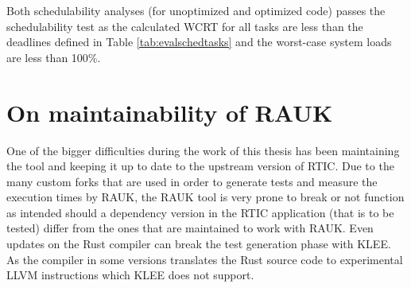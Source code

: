 Both schedulability analyses (for unoptimized and optimized code) passes the
schedulability test as the calculated WCRT for all tasks are less than
the deadlines defined in Table \ref{tab:evalschedtasks} and the worst-case
system loads are less than 100\%.

\section{On maintainability of RAUK}
One of the bigger difficulties during the work of this thesis has been
maintaining the tool and keeping it up to date to the upstream version of RTIC.
Due to the many custom forks that are used in order to generate tests and
measure the execution times by RAUK, the RAUK tool is very prone to break or
not function as intended should a dependency version in the RTIC application
(that is to be tested) differ from the ones that are maintained to work with
RAUK. Even updates on the Rust compiler can break the test generation phase
with KLEE. As the compiler in some versions translates the Rust source code to
experimental LLVM instructions which KLEE does not support.
